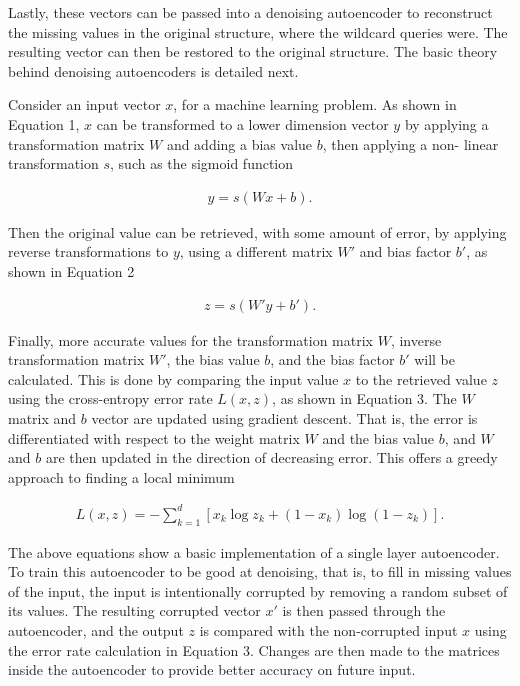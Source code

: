 \documentclass{sig-alternate}
\begin{document}
Lastly, these vectors can be passed into a denoising autoencoder to reconstruct the missing values
in the original structure, where the wildcard queries were. The resulting vector can then be restored
to the original structure. The basic theory behind denoising autoencoders is detailed next.

Consider an input vector $x$, for a machine learning problem.
As shown in Equation 1, $x$ can be transformed to a lower dimension
vector $y$ by applying a transformation matrix $W$ and adding a bias value $b$, then applying a non-
linear transformation $s$, such as the sigmoid function

\begin{gather}
y = s(Wx + b).
\end{gather}

Then the original value can be retrieved, with some amount of error, by applying reverse transformations to $y$,
using a different matrix $W'$ and bias factor $b'$, as shown in Equation 2

\begin{gather}
z = s(W' y  + b').
\end{gather}

Finally, more accurate values for the transformation matrix $W$, inverse transformation matrix $W'$, the bias value $b$, and the bias factor $b'$ will be calculated. This is done by comparing the input value $x$ to the retrieved value $z$ 
using the cross-entropy error rate $L(x,z)$, as shown in Equation 3. The $W$ matrix and $b$ vector
are updated using gradient descent. That is, the error is differentiated
with respect to the weight matrix $W$ and the bias value $b$, and $W$ and $b$ are then updated in the
direction of decreasing error. This offers a greedy approach to finding a local minimum

\begin{gather}
L(x,z) = -\sum_{k=1}^d [x_k \log z_k + (1-x_k) \log(1-z_k)].
\end{gather}

The above equations show a basic implementation of a single layer autoencoder. To train this
autoencoder to be good at denoising, that is, to fill in missing values of the input, the input
is intentionally corrupted by removing a random subset of its values. The resulting corrupted
vector $x'$ is then passed through the autoencoder, and the output $z$ is compared with the
non-corrupted input $x$ using the error rate calculation in Equation 3. Changes are then made
to the matrices inside the autoencoder to provide better accuracy on future input.
\end{document}
